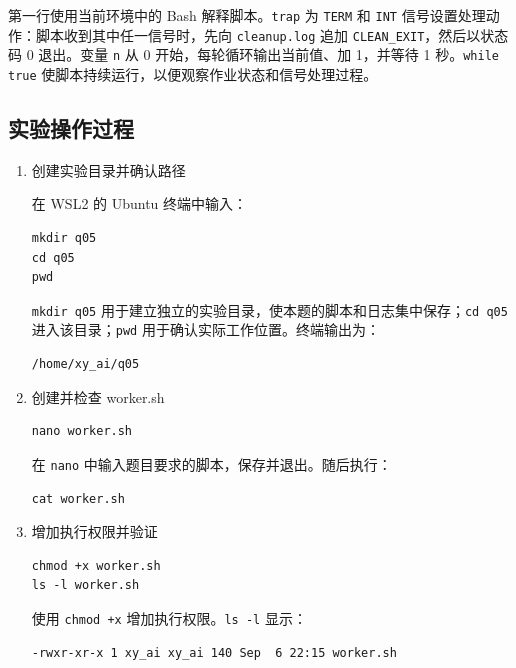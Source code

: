 \documentclass[a4paper,12pt]{report}
\begin{document}
第一行使用当前环境中的 Bash 解释脚本。\texttt{trap} 为 \texttt{TERM} 和 \texttt{INT} 信号设置处理动作：脚本收到其中任一信号时，先向 \texttt{cleanup.log} 追加 \texttt{CLEAN\_EXIT}，然后以状态码 0 退出。变量 \texttt{n} 从 0 开始，每轮循环输出当前值、加 1，并等待 1 秒。\texttt{while true} 使脚本持续运行，以便观察作业状态和信号处理过程。

\subsection{实验操作过程}

\begin{enumerate}
  \item {\large 创建实验目录并确认路径}

  在 WSL2 的 Ubuntu 终端中输入：

\begin{lstlisting}
mkdir q05
cd q05
pwd
\end{lstlisting}

  \texttt{mkdir q05} 用于建立独立的实验目录，使本题的脚本和日志集中保存；\texttt{cd q05} 进入该目录；\texttt{pwd} 用于确认实际工作位置。终端输出为：

\begin{lstlisting}
/home/xy_ai/q05
\end{lstlisting}




  \item {\large 创建并检查 worker.sh}

\begin{lstlisting}
nano worker.sh
\end{lstlisting}

  在 \texttt{nano} 中输入题目要求的脚本，保存并退出。随后执行：

\begin{lstlisting}
cat worker.sh
\end{lstlisting}


  \item {\large 增加执行权限并验证}

\begin{lstlisting}
chmod +x worker.sh
ls -l worker.sh
\end{lstlisting}

使用 \texttt{chmod +x} 增加执行权限。\texttt{ls -l} 显示：

\begin{lstlisting}
-rwxr-xr-x 1 xy_ai xy_ai 140 Sep  6 22:15 worker.sh
\end{lstlisting}



\end{enumerate}
\end{document}
